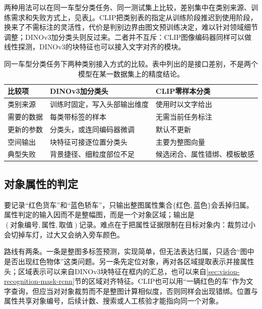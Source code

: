 两种用法可以在同一车型分类任务、同一测试集上比较，差别集中在类别来源、训练需求和失败方式上，见表\ref{tab:vision-recognition-classification-compare}。CLIP把类别表的指定从训练阶段推迟到使用阶段，换来了不需标注的灵活性，代价是判别边界由图文预训练决定，难以针对领域细节调整；DINOv3加分类头则反过来。二者并不互斥：CLIP图像编码器同样可以做线性探测，DINOv3的块特征也可以接入文字对齐的模块。

\begin{table}[htbp]
 \centering
 \small
 \begin{tabularx}{\linewidth}{@{}lXX@{}}
 \toprule
 比较项 & DINOv3加分类头 & CLIP零样本分类\\
 \midrule
 类别来源 & 训练时固定，写入头部输出维度 & 使用时以文字给出\\
 需要的数据 & 每类带标签的样本 & 无需当前任务标注\\
 更新的参数 & 分类头，或连同编码器微调 & 默认不更新\\
 空间输出 & 块特征可接逐位置分类头 & 主要为整图向量\\
 典型失败 & 背景捷径、细粒度部位不足 & 候选闭合、属性错绑、模板敏感\\
 \bottomrule
 \end{tabularx}
 \caption{同一车型分类任务下两种类别接入方式的比较。表中列出的是接口差别，不是两个模型在某一数据集上的精度结论。}
 \label{tab:vision-recognition-classification-compare}
\end{table}

\subsection{对象属性的判定}
\label{sec:vision-recognition-attributes}

要记录“红色货车”和“蓝色轿车”，只输出整图属性集合$\{\text{红色},\text{蓝色}\}$会丢掉归属。属性判定的输入因而不是整幅图，而是一个对象区域；输出是$(\text{对象编号},\text{属性},\text{取值})$记录。难点在于把属性证据限制在目标对象内：裁剪过小会切掉车灯，过大又会纳入旁车颜色。

路线有两条。一条是整图多标签预测，实现简单，但无法表达归属，只适合“图中是否出现红色物体”这类问题。另一条先定位对象，再对各区域提取表示并接属性头；区域表示可以来自DINOv3块特征在框内的汇总，也可以来自\ref{sec:vision-recognition-mask-rcnn}节的区域对齐特征。CLIP也可以用“一辆红色的车”作为文字查询，但应当对对象裁剪而不是整图计算相似度，否则同样会出现错绑。位置与属性共享对象编号，后续计数、搜索或人工核验才能指向同一个对象。

